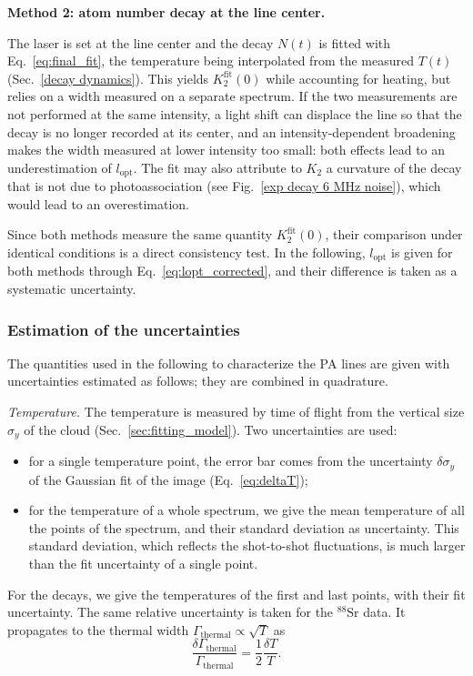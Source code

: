 \textbf{Method 2: atom number decay at the line center.}

The laser is set at the line center and the decay $N(t)$ is fitted with
Eq.~\ref{eq:final_fit}, the temperature being interpolated from the measured
$T(t)$ (Sec.~\ref{decay dynamics}). This yields $K_2^{\text{fit}}(0)$ while
accounting for heating, but relies on a width measured on a separate spectrum.
If the two measurements are not performed at the same intensity, a light shift can
displace the line so that the decay is no longer recorded at its center, and an
intensity-dependent broadening makes the width measured at lower intensity too
small: both effects lead to an underestimation of $l_{\text{opt}}$. The fit may
also attribute to $K_2$ a curvature of the decay that is not due to
photoassociation (see Fig.~\ref{exp decay 6 MHz noise}), which would lead to an
overestimation.

Since both methods measure the same quantity $K_2^{\text{fit}}(0)$, their
comparison under identical conditions is a direct consistency test. In the
following, $l_{\text{opt}}$ is given for both methods through
Eq.~\ref{eq:lopt_corrected}, and their difference is taken as a systematic
uncertainty.

\subsubsection{Estimation of the uncertainties}
\label{sec:uncertainties}
The quantities used in the following to characterize the PA lines are given with
uncertainties estimated as follows; they are combined in quadrature.

\textit{Temperature.} The temperature is measured by time of flight from the vertical
size $\sigma_y$ of the cloud (Sec.~\ref{sec:fitting_model}). Two uncertainties are used:
\begin{itemize}
    \item for a single temperature point, the error bar comes from the uncertainty
    $\delta\sigma_y$ of the Gaussian fit of the image (Eq.~\ref{eq:deltaT});
    \item for the temperature of a whole spectrum, we give the mean temperature of all the
    points of the spectrum, and their standard deviation as uncertainty. This standard
    deviation, which reflects the shot-to-shot fluctuations, is much larger than the fit
    uncertainty of a single point.
\end{itemize}
For the decays, we give the temperatures of the first and last points, with their fit
uncertainty. The same relative uncertainty is taken for the $^{88}\text{Sr}$ data. It propagates to the thermal width $\Gamma_{\text{thermal}}\propto\sqrt{T}$ as
\begin{equation}
\frac{\delta\Gamma_{\text{thermal}}}{\Gamma_{\text{thermal}}}=\frac{1}{2}\frac{\delta T}{T}.
\end{equation}

